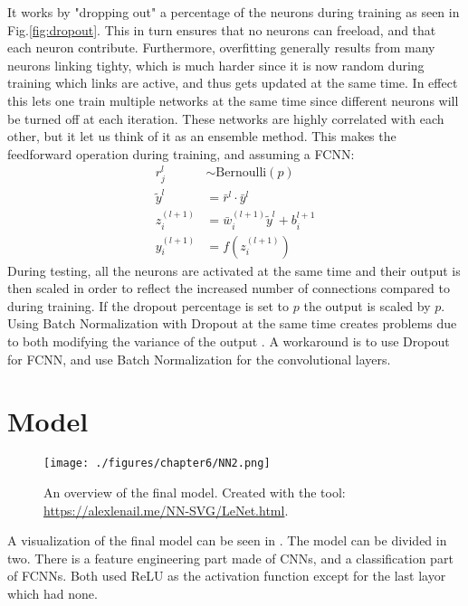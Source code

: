 It works by "dropping out" a percentage of the neurons during training as seen in Fig.\ref{fig:dropout}. 
This in turn ensures that no neurons can freeload, and that each neuron contribute. Furthermore, overfitting generally results from many neurons linking tighty, which is much harder since it is now random during training which links are active, and thus gets updated at the same time. 
In effect this lets one train multiple networks at the same time since different neurons will be turned off at each iteration.
These networks are highly correlated with each other, but it let us think of it as an ensemble method. 
This makes the feedforward operation during training, and assuming a \ac{FCNN}:
\begin{align}
	r_j^l &\sim \text{Bernoulli}(p)\\
	\tilde{y}^l &=\bar{r}^l \cdot \bar{y}^l \\
	z_i^{(l+1)} &= \bar{w}_i^{(l+1)}\tilde{y}^l + b_i^{l+1}\\
	y_i^{(l+1)} &= f(z_i^{(l+1)})
\end{align}
During testing, all the neurons are activated at the same time and their output is then scaled in order to reflect the increased number of connections compared to during training.
If the dropout percentage is set to $p$ the output is scaled by $p$.
Using Batch Normalization with Dropout at the same time creates problems due to both modifying the variance of the output \cite{liUnderstandingDisharmonyDropout2019}. 
A workaround is to use Dropout for \ac{FCNN}, and use Batch Normalization for the convolutional layers.
\section{Model}
\label{sec:mymodel}
\begin{figure}[h]
	\begin{whole}
		\texttt{[image: ./figures/chapter6/NN2.png]}
		\caption{An overview of the final model.
			Created with the tool: \url{https://alexlenail.me/NN-SVG/LeNet.html}.}
		\label{fig:mymodel}
	\end{whole}
\end{figure}
A visualization of the final model can be seen in .
The model can be divided in two. There is a feature engineering part made of \acp{CNN}, and a classification part of \acp{FCNN}. 
Both used \ac{ReLU} as the activation function except for the last layor which had none.
